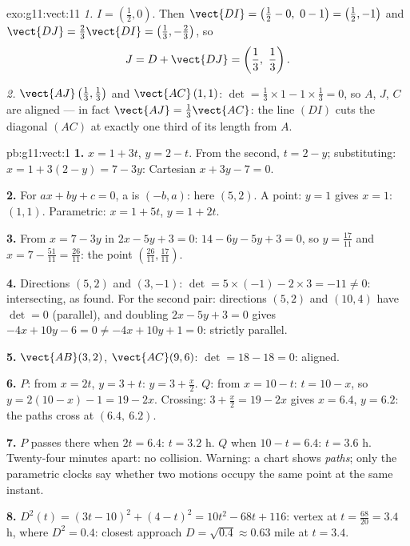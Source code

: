\begin{solution}{exo:g11:vect:11}
\emph{1.} $I = \left(\frac12, 0\right)$. Then
$\vect{DI} = \left(\frac12 - 0,\ 0 - 1\right) = \left(\frac12, -1\right)$
and $\vect{DJ} = \frac23\vect{DI} = \left(\frac13, -\frac23\right)$, so
\[
J = D + \vect{DJ} = \left(\frac13,\ \frac13\right).
\]

\emph{2.} $\vect{AJ}\left(\frac13, \frac13\right)$ and
$\vect{AC}\,(1, 1)$:
$\det = \frac13 \times 1 - 1 \times \frac13 = 0$, so $A$, $J$, $C$ are
aligned --- in fact $\vect{AJ} = \frac13\vect{AC}$: the line $(DI)$ cuts
the diagonal $(AC)$ at exactly one third of its length from $A$.
\end{solution}

\begin{solution}{pb:g11:vect:1}
\textbf{1.} $x = 1 + 3t$, $y = 2 - t$. From the second,
$t = 2 - y$; substituting: $x = 1 + 3(2 - y) = 7 - 3y$:
Cartesian  $x + 3y - 7 = 0$.

\textbf{2.} For $ax + by + c = 0$, a  is
$(-b, a)$: here $(5, 2)$. A point: $y = 1$ gives $x = 1$:
$(1, 1)$. Parametric: $x = 1 + 5t$, $y = 1 + 2t$.

\textbf{3.} From $x = 7 - 3y$ in $2x - 5y + 3 = 0$:
$14 - 6y - 5y + 3 = 0$, so $y = \frac{17}{11}$ and
$x = 7 - \frac{51}{11} = \frac{26}{11}$: the point
$\left(\frac{26}{11}, \frac{17}{11}\right)$.

\textbf{4.} Directions $(5, 2)$ and $(3, -1)$:
$\det = 5 \times (-1) - 2 \times 3 = -11 \neq 0$: intersecting,
as found. For the second pair: directions $(5, 2)$ and
$(10, 4)$ have $\det = 0$ (parallel), and doubling
$2x - 5y + 3 = 0$ gives $-4x + 10y - 6 = 0 \neq -4x + 10y + 1
= 0$: strictly parallel.

\textbf{5.} $\vect{AB}(3, 2)$, $\vect{AC}(9, 6)$:
$\det = 18 - 18 = 0$: aligned.

\textbf{6.} $P$: from $x = 2t$, $y = 3 + t$: $y = 3 +
\frac x2$. $Q$: from $x = 10 - t$: $t = 10 - x$, so
$y = 2(10 - x) - 1 = 19 - 2x$. Crossing:
$3 + \frac x2 = 19 - 2x$ gives $x = 6.4$, $y = 6.2$: the paths
cross at $(6.4,\ 6.2)$.

\textbf{7.} $P$ passes there when $2t = 6.4$: $t = 3.2$ h. $Q$
when $10 - t = 6.4$: $t = 3.6$ h. Twenty-four minutes apart: no
collision. Warning: a chart shows \emph{paths}; only the
parametric clocks say whether two motions occupy the same point
at the same instant.

\textbf{8.} $D^2(t) = (3t - 10)^2 + (4 - t)^2 =
10t^2 - 68t + 116$: vertex at $t = \frac{68}{20} = 3.4$ h,
where $D^2 = 0.4$: closest approach
$D = \sqrt{0.4} \approx 0.63$ mile at $t = 3.4$.


\end{solution}
